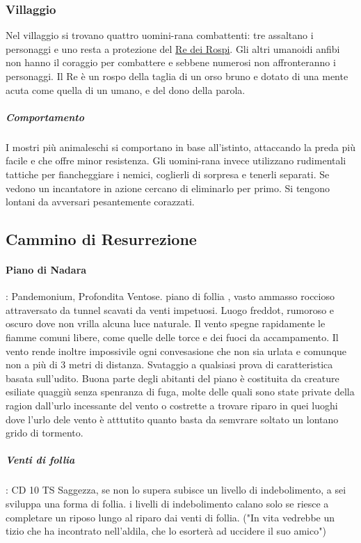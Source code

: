 \documentclass{article}
\begin{document}
            \subsubsection{Villaggio}
Nel villaggio si trovano quattro uomini-rana combattenti: tre assaltano i personaggi e uno resta a protezione del \hyperlink{re}{Re dei Rospi}. Gli altri umanoidi anfibi non hanno il coraggio per combattere e sebbene numerosi non affronteranno i personaggi. Il Re è un rospo della taglia di un orso bruno e dotato di una mente acuta come quella di un umano, e del dono della parola.

                        \subparagraph{Comportamento}
I mostri più animaleschi si comportano in base all’istinto, attaccando la preda più facile e che offre minor resistenza. Gli uomini-rana invece utilizzano rudimentali tattiche per fiancheggiare i nemici, coglierli di sorpresa e tenerli separati. Se vedono un incantatore in azione cercano di eliminarlo per primo. Si tengono lontani da avversari pesantemente corazzati.




        \subsection{Cammino di Resurrezione}
            \paragraph{Piano di Nadara}: Pandemonium, Profondita Ventose. piano di follia , vasto ammasso roccioso attraversato da tunnel scavati da venti impetuosi. Luogo freddot, rumoroso e oscuro dove non vrilla alcuna luce naturale. Il vento spegne rapidamente le fiamme comuni libere, come quelle delle torce e dei fuoci da accampamento. Il vento rende inoltre impossivile ogni convesasione che non sia urlata e comunque non a più di 3 metri di distanza. Svataggio a qualsiasi prova di caratteristica basata sull'udito. Buona parte degli abitanti del piano è costituita da creature esiliate quaggiù senza spenranza di fuga, molte delle quali sono state private della ragion dall'urlo incessante del vento o costrette a trovare riparo in quei luoghi dove l'urlo dele vento è atttutito quanto basta da semvrare soltato un lontano grido di tormento. 
                \subparagraph{Venti di follia}: CD 10 TS Saggezza, se non lo supera subisce un livello di indebolimento, a sei sviluppa una forma di follia. i livelli di indebolimento calano solo se riesce a completare un riposo lungo al riparo dai venti di follia.  ("In vita vedrebbe un tizio che ha incontrato nell'aldila, che lo esorterà ad uccidere il suo amico")
\end{document}
